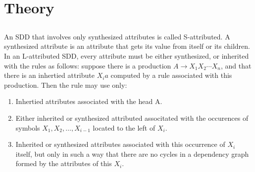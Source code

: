 \documentclass[a4paper]{article}
\date{}
\begin{document}
\thispagestyle{fancy}

\section{Theory}
\subsection{}

An SDD that involves only synthesized attributes is called S-attributed. A synthesized attribute is an attribute that gets its value from itself or its children. In an L-attributed SDD, every attribute must be either synthesized, or inherited with the rules as follows: suppose there is a production $A \rightarrow X_1X_2\cdots X_n$, and that there is an inhertied attribute $X_ia$ computed by a rule associated with this production. Then the rule may use only:

\begin{enumerate}
    \item Inhertied attributes associated with the head A.
    \item Either inherited or synthesized attributed associtated with the occurences of symbols $X_1, X_2,\ldots,X_{i-1}$ located to the left of $X_i$.
    \item Inherited or synthesized attributes associated with this occurrence of $X_i$ itself, but only in such a way that there are no cycles in a dependency graph formed by the attributes of this $X_i$.
\end{enumerate}

\subsection{}
\end{document}
